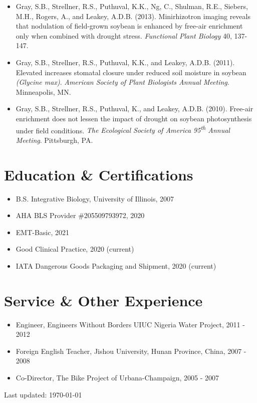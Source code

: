 \documentclass[letterpaper]{article}
\def\footerlink{}
\begin{document}
  \begin{itemize}

    \item Gray, S.B., Strellner, R.S., Puthuval, K.K., Ng, C., Shulman, R.E., Siebers, M.H., Rogers, A., and Leakey, A.D.B. (2013). Minirhizotron imaging reveals that nodulation of field-grown soybean is enhanced by free-air  enrichment only when combined with drought stress. {\it Functional Plant Biology} 40, 137-147.
    \item Gray, S.B., Strellner, R.S., Puthuval, K.K., and Leakey, A.D.B. (2011). Elevated  increases stomatal closure under reduced soil moisture in soybean {\it(Glycine max)}. {\it American Society of Plant Biologists Annual Meeting}. Minneapolis, MN.
    \item Gray, S.B., Strellner, R.S., Puthuval, K., and Leakey, A.D.B. (2010). Free-air  enrichment does not lessen the impact of drought on soybean photosynthesis under field conditions. {\it The Ecological Society of America 95\textsuperscript{th} Annual Meeting}. Pittsburgh, PA.

  \end{itemize}

\section*{Education \& Certifications}

  \begin{itemize}
    \item B.S. Integrative Biology, University of Illinois, 2007
    \item AHA BLS Provider \#205509793972, 2020
    \item EMT-Basic, 2021
    \item Good Clinical Practice, 2020 (current)
    \item IATA Dangerous Goods Packaging and Shipment, 2020 (current)
  \end{itemize}

\section*{Service \& Other Experience}

  \begin{itemize}
      \item Engineer, Engineers Without Borders UIUC Nigeria Water Project, 2011 - 2012
      \item Foreign English Teacher, Jishou University, Hunan Province, China, 2007 - 2008
      \item Co-Director, The Bike Project of Urbana-Champaign, 2005 - 2007
  \end{itemize}

\bigskip

\begin{center}
  \begin{footnotesize}
    Last updated: \today \\
    \href{\footerlink}{\texttt{\footerlink}}
  \end{footnotesize}
\end{center}
\end{document}
